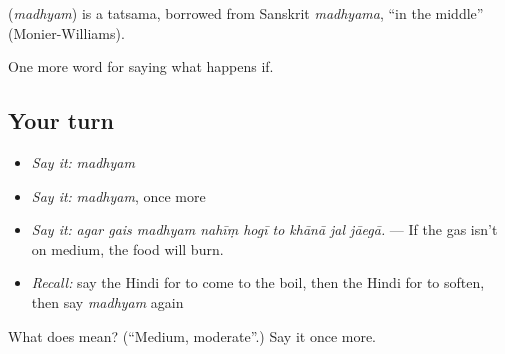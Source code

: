 \begin{cousinweb}
\textbf{} (\emph{madhyam}) is a tatsama, borrowed from Sanskrit \emph{madhyama}, \textquotedblleft{}in the middle\textquotedblright{} (Monier-Williams).
\end{cousinweb}

\begin{grammarlens}[title={What you've built}]
One more word for saying what happens if.
\end{grammarlens}

\subsection*{Your turn}
\begin{itemize}
\raggedright
  \item \emph{Say it:} \emph{madhyam}
  \item \emph{Say it:} \emph{madhyam}, once more
  \item \emph{Say it:} \emph{agar gais madhyam nahīṃ hogī to khānā jal jāegā.} — If the gas isn't on medium, the food will burn.
  \item \emph{Recall:} say the Hindi for to come to the boil, then the Hindi for to soften, then say \emph{madhyam} again
\end{itemize}

\begin{tcolorbox}[breakable,colback=teal!4,colframe=teal!35!black,title={Before you move on}]
What does  mean? (\textquotedblleft{}Medium, moderate\textquotedblright{}.) Say it once more.
\end{tcolorbox}
